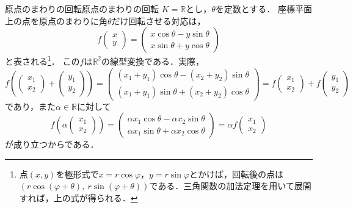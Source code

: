 \begin{example}{原点のまわりの回転}{原点のまわりの回転}
  $K = \mathbb{R}$とし，$\theta$を定数とする．
  座標平面上の点を原点のまわりに角$\theta$だけ回転させる対応は，
  \[
    f\begin{pmatrix} x \\ y \end{pmatrix}
    = \begin{pmatrix} x\cos\theta - y\sin\theta \\ x\sin\theta + y\cos\theta \end{pmatrix}
  \]
  と表される\footnote{点$(x, y)$を極形式で$x = r\cos\varphi$，$y = r\sin\varphi$とかけば，回転後の点は$(r\cos(\varphi + \theta),\ r\sin(\varphi + \theta))$である．三角関数の加法定理を用いて展開すれば，上の式が得られる．}．
  この$f$は$\mathbb{R}^2$の線型変換である．実際，
  \[
    f\left( \begin{pmatrix} x_1 \\ x_2 \end{pmatrix} + \begin{pmatrix} y_1 \\ y_2 \end{pmatrix} \right)
    = \begin{pmatrix} (x_1 + y_1)\cos\theta - (x_2 + y_2)\sin\theta \\ (x_1 + y_1)\sin\theta + (x_2 + y_2)\cos\theta \end{pmatrix}
    = f\begin{pmatrix} x_1 \\ x_2 \end{pmatrix} + f\begin{pmatrix} y_1 \\ y_2 \end{pmatrix}
  \]
  であり，また$\alpha \in \mathbb{R}$に対して
  \[
    f\left( \alpha \begin{pmatrix} x_1 \\ x_2 \end{pmatrix} \right)
    = \begin{pmatrix} \alpha x_1 \cos\theta - \alpha x_2 \sin\theta \\ \alpha x_1 \sin\theta + \alpha x_2 \cos\theta \end{pmatrix}
    = \alpha f\begin{pmatrix} x_1 \\ x_2 \end{pmatrix}
  \]
  が成り立つからである．
  \par\medskip


\end{example}
